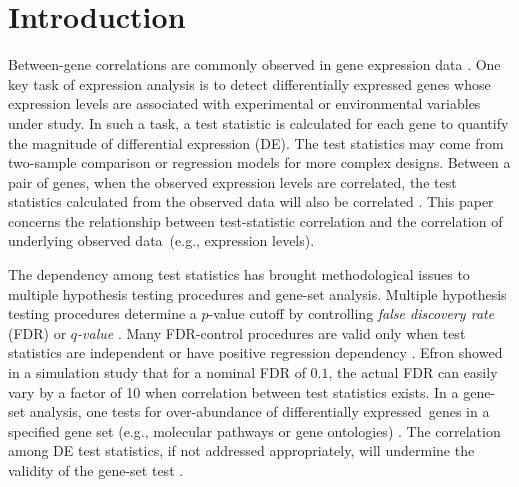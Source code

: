 \documentclass[review]{elsarticle}
\newcommand{\popucor}{the correlation of underlying observed data}
\newcommand{\DED}{differentially expressed}
\begin{document}
	\section{Introduction}
	Between-gene correlations are commonly observed in gene expression 
	data \citep{efron2012large1, gatti2010heading, huang2013gene,qiu2005effects,storey2003positive}.
	One key task of expression analysis is to detect differentially expressed genes whose 
	expression levels are associated with experimental or environmental variables under study. 
	In such a task, a test statistic is calculated for each gene to quantify the magnitude of 
	differential expression (DE). 
	The test statistics may come from two-sample comparison or regression models for more complex 
	designs. Between a pair of genes, when the observed expression levels are correlated, the test 
	statistics calculated from the observed data will also be correlated 
	\citep{barry2008statistical, efron2007correlation, wu2012camera}. This paper concerns the 
	relationship between test-statistic correlation and \popucor~(e.g., expression levels).
	
	The dependency among test statistics has brought methodological issues to multiple hypothesis 
	testing procedures and gene-set analysis. 
	Multiple hypothesis testing procedures determine a $p$-value cutoff by controlling 
	\textit{false discovery rate} (FDR) 
	\citep{benjamini1995controlling} or 
	\textit{$q$-value} \citep{storey2003positive}. 
	Many FDR-control procedures are valid only 
	when test statistics are independent \citep{benjamini1995controlling} or 
	have positive regression dependency \citep{benjamini2001control}. 
	Efron \cite{efron2007correlation} showed in a simulation study that for a nominal FDR of 
	$0.1$, the actual FDR can easily vary by a factor of 10 when correlation between test 
	statistics exists. 
	In a gene-set analysis, one tests for over-abundance of \DED~genes in a
	specified gene set (e.g., molecular pathways or gene ontologies) \citep{goeman2007analyzing}. 
	The correlation among DE test statistics, if not addressed appropriately, will undermine 
	the validity of the gene-set test \citep{gatti2010heading, wu2012camera}. 
	
\end{document}
